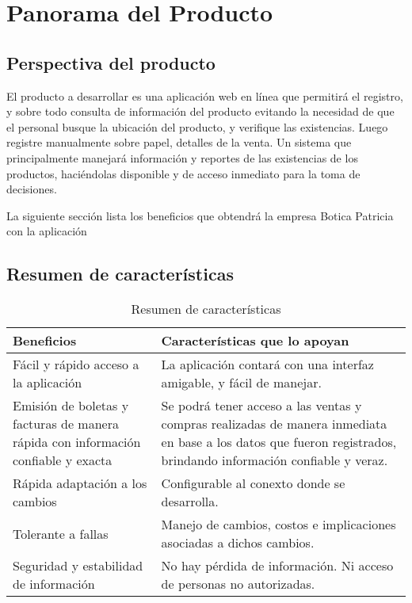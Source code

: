 \documentclass[a4paper,11pt, spanish]{report}
\begin{document}
{{{{    \section{Panorama del Producto}
      \subsection{Perspectiva del producto}
        El producto a desarrollar es una aplicación web en línea que permitirá el registro, y sobre todo consulta de información del producto evitando la necesidad de que el personal busque la ubicación del producto, y verifique las existencias. Luego registre manualmente sobre papel, detalles de la venta. Un sistema que principalmente manejará información y reportes de las existencias de los productos, haciéndolas disponible y de acceso inmediato para la toma de decisiones.
        
        La siguiente sección lista los beneficios que obtendrá la empresa Botica Patricia con la aplicación
        
      \subsection{Resumen de características}
        {\renewcommand{\arraystretch}{1.7}%
        \noindent\begin{table}[H]
        \noindent\begin{tabularx}{\textwidth}{X|X}
          \textbf{{\large Beneficios}} & \textbf{{\large Características que lo apoyan}} \\
          \hline
          Fácil y rápido acceso a la aplicación & La aplicación contará con una interfaz amigable, y fácil de manejar. \\
          Emisión de boletas y facturas de manera rápida con información confiable y exacta & Se podrá tener acceso a las ventas y compras realizadas de manera inmediata en base a los datos que fueron registrados, brindando información confiable y veraz.\\
          Rápida adaptación a los cambios & Configurable al conexto donde se desarrolla. \\
          Tolerante a fallas & Manejo de cambios, costos e implicaciones asociadas a dichos cambios.\\
          Seguridad y estabilidad de información & No hay pérdida de información. Ni acceso de personas no autorizadas.
        \end{tabularx}
        \caption{Resumen de características}
        \end{table}
}}}}}
\end{document}
